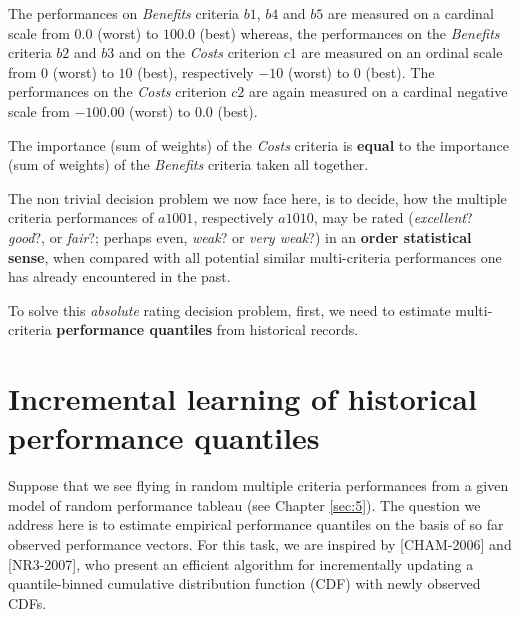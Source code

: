 The performances on \emph{Benefits} criteria $b1$, $b4$ and $b5$ are measured on a cardinal scale from $0.0$ (worst) to $100.0$ (best) whereas, the performances on the \emph{Benefits} criteria $b2$ and $b3$  and on the \emph{Costs} criterion $c1$ are measured on an ordinal scale from $0$ (worst) to $10$ (best), respectively $-10$ (worst) to $0$ (best). The performances on the \emph{Costs} criterion $c2$ are again measured on a cardinal negative scale from $-100.00$ (worst) to $0.0$ (best).

The importance (sum of weights) of the \emph{Costs} criteria is \textbf{equal} to the importance (sum of weights) of the \emph{Benefits} criteria taken all together.
   
The non trivial decision problem we now face here, is to decide, how the multiple criteria performances of $a1001$, respectively $a1010$,  may be rated (\emph{excellent}? \emph{good}?, or \emph{fair}?; perhaps even, \emph{weak}? or \emph{very weak}?) in an \textbf{order statistical sense}, when compared with all potential similar multi-criteria performances one has already encountered in the past. 

To solve this \emph{absolute} rating decision problem, first, we need to estimate multi-criteria \textbf{performance quantiles} from historical records.  

\section{Incremental learning of historical performance quantiles}
\label{sec:10.2}

Suppose that we see flying in random multiple criteria performances from a given model of random performance tableau (see Chapter \ref{sec:5}). The question we address here is to estimate empirical performance quantiles on the basis of so far observed performance vectors. For this task, we are inspired by [CHAM-2006] and [NR3-2007], who present an efficient algorithm for incrementally updating a quantile-binned cumulative distribution function (CDF) with newly observed CDFs.

